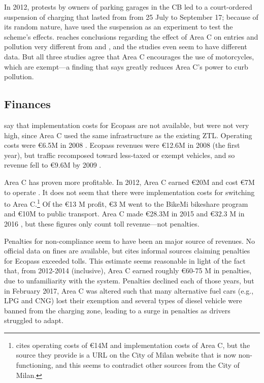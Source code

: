 In 2012, protests by owners of parking garages in the CB led to a court-ordered suspension of charging that lasted from from 25 July to September 17; because of its random nature, have used the suspension as an experiment to test the scheme's effects. \citet{Gibson2015} reaches conclusions regarding the effect of Area C on entries and pollution very different from \citet{Percoco2013} and \citet{Percoco2014}, and the studies even seem to have different data. But all three studies agree that Area C encourages the use of motorcycles, which are exempt---a finding that \citet{Percoco2013} says greatly reduces Area C's power to curb pollution.

\subsection{Finances}

\citet{Rotaris2010} say that implementation costs for Ecopass are not available, but were not very high, since Area C used the same infrastructure as the existing ZTL. Operating costs were \euro 6.5M in 2008 \citep[p. 49]{AMMA2009}. Ecopass revenues were \euro 12.6M in 2008 (the first year), but traffic recomposed toward less-taxed or exempt vehicles, and so revenue fell to \euro 9.6M by 2009 \citep[p. 51]{AMAT2010}. 

Area C has proven more profitable. In 2012, Area C earned \euro 20M and cost \euro 7M to operate \citep{Beria2015}. It does not seem that there were implementation costs for switching to Area C.\footnote{\citet{Croci2016} cites operating costs of \euro 14M and implementation costs of Area C, but the source they provide is a URL on the City of Milan website that is now non-functioning, and this seems to contradict other sources from the City of Milan.} Of the \euro 13 M profit, \euro 3 M went to the BikeMi bikeshare program and \euro 10M to public transport. Area C made \euro 28.3M in 2015 \citep[p. 28]{Milan2016} and \euro 32.3 M in 2016 \citep[p. 25]{Milan2017}, but these figures only count toll revenue---not penalties. 

Penalties for non-compliance seem to have been an major source of revenues. No official data on fines are available, but \citet{Rotaris2010} cites informal sources claiming  penalties for Ecopass exceeded tolls. This estimate seems reasonable in light of the fact that, from 2012-2014 (inclusive), Area C earned roughly \euro 60-75 M in penalties, due to unfamiliarity with the system. Penalties declined each of those years, but in February 2017, Area C was altered such that many alternative fuel cars (e.g., LPG and CNG) lost their exemption and several types of diesel vehicle were banned from the charging zone, leading to a surge in penalties as drivers struggled to adapt.

